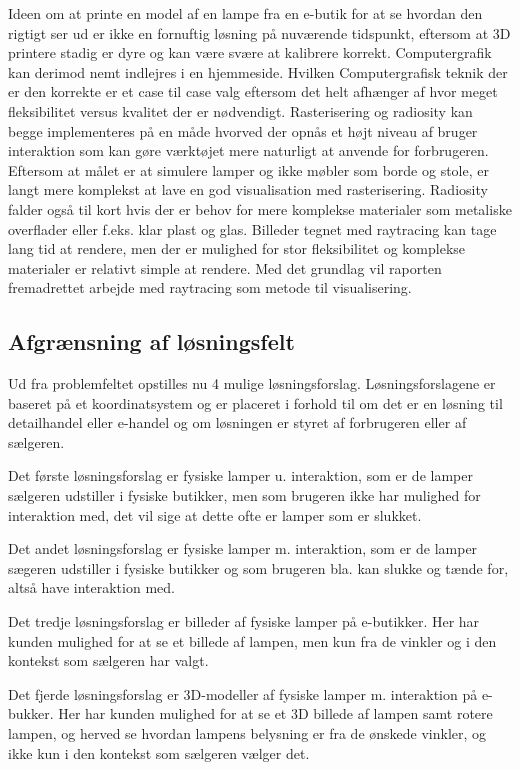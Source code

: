 Ideen om at printe en model af en lampe fra en e-butik for at se hvordan den rigtigt ser ud er ikke en fornuftig løsning på nuværende tidspunkt, eftersom at 3D printere stadig er dyre og kan være svære at kalibrere korrekt. Computergrafik kan derimod nemt indlejres i en hjemmeside. Hvilken Computergrafisk teknik der er den korrekte er et case til case valg eftersom det helt afhænger af hvor meget fleksibilitet versus kvalitet der er nødvendigt. Rasterisering og radiosity kan begge implementeres på en måde hvorved der opnås et højt niveau af bruger interaktion som kan gøre værktøjet mere naturligt at anvende for forbrugeren. Eftersom at målet er at simulere lamper og ikke møbler som borde og stole, er langt mere komplekst at lave en god visualisation med rasterisering. Radiosity falder også til kort hvis der er behov for mere komplekse materialer som metaliske overflader eller f.eks. klar plast og glas. Billeder tegnet med raytracing kan tage lang tid at rendere, men der er mulighed for stor fleksibilitet og komplekse materialer er relativt simple at rendere. Med det grundlag vil raporten fremadrettet arbejde med raytracing som metode til visualisering.

\subsection{Afgrænsning af løsningsfelt}

Ud fra problemfeltet opstilles nu 4 mulige løsningsforslag. Løsningsforslagene er baseret på et koordinatsystem 
og er placeret i forhold til om det er en løsning til detailhandel eller e-handel og om løsningen er styret af forbrugeren eller af sælgeren.

Det første løsningsforslag er fysiske lamper u. interaktion, som er de lamper sælgeren udstiller i fysiske butikker, men som brugeren ikke har mulighed for interaktion med, det vil sige at dette ofte er lamper som er slukket.

Det andet løsningsforslag er fysiske lamper m. interaktion, som er de lamper sægeren udstiller i fysiske butikker og som brugeren bla. kan slukke og tænde for, altså have interaktion med.

Det tredje løsningsforslag er  billeder af fysiske lamper på e-butikker. Her har kunden mulighed for at se et billede af lampen, men kun fra de vinkler og i den kontekst som sælgeren har valgt.

Det fjerde løsningsforslag er 3D-modeller af fysiske lamper m. interaktion på e-bukker. Her har kunden mulighed for at se et 3D billede af lampen samt rotere lampen, og herved se hvordan lampens belysning er fra de ønskede vinkler, og ikke kun i den kontekst som sælgeren vælger det. 


